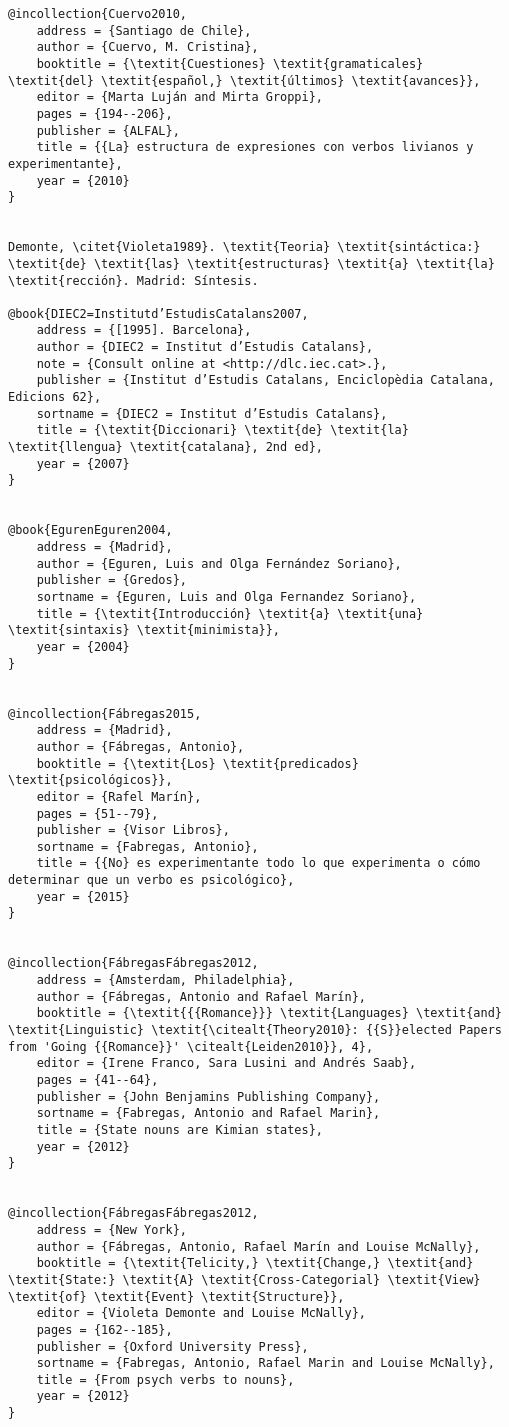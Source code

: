 \documentclass[output=paper,modfonts,nonflat]{langsci/langscibook}
\begin{document}
\begin{verbatim}
@incollection{Cuervo2010,
	address = {Santiago de Chile},
	author = {Cuervo, M. Cristina},
	booktitle = {\textit{Cuestiones} \textit{gramaticales} \textit{del} \textit{español,} \textit{últimos} \textit{avances}},
	editor = {Marta Luján and Mirta Groppi},
	pages = {194--206},
	publisher = {ALFAL},
	title = {{La} estructura de expresiones con verbos livianos y experimentante},
	year = {2010}
}


Demonte, \citet{Violeta1989}. \textit{Teoria} \textit{sintáctica:} \textit{de} \textit{las} \textit{estructuras} \textit{a} \textit{la} \textit{rección}. Madrid: Síntesis.

@book{DIEC2=Institutd’EstudisCatalans2007,
	address = {[1995]. Barcelona},
	author = {DIEC2 = Institut d’Estudis Catalans},
	note = {Consult online at <http://dlc.iec.cat>.},
	publisher = {Institut d’Estudis Catalans, Enciclopèdia Catalana, Edicions 62},
	sortname = {DIEC2 = Institut d’Estudis Catalans},
	title = {\textit{Diccionari} \textit{de} \textit{la} \textit{llengua} \textit{catalana}, 2nd ed},
	year = {2007}
}


@book{EgurenEguren2004,
	address = {Madrid},
	author = {Eguren, Luis and Olga Fernández Soriano},
	publisher = {Gredos},
	sortname = {Eguren, Luis and Olga Fernandez Soriano},
	title = {\textit{Introducción} \textit{a} \textit{una} \textit{sintaxis} \textit{minimista}},
	year = {2004}
}


@incollection{Fábregas2015,
	address = {Madrid},
	author = {Fábregas, Antonio},
	booktitle = {\textit{Los} \textit{predicados} \textit{psicológicos}},
	editor = {Rafel Marín},
	pages = {51--79},
	publisher = {Visor Libros},
	sortname = {Fabregas, Antonio},
	title = {{No} es experimentante todo lo que experimenta o cómo determinar que un verbo es psicológico},
	year = {2015}
}


@incollection{FábregasFábregas2012,
	address = {Amsterdam, Philadelphia},
	author = {Fábregas, Antonio and Rafael Marín},
	booktitle = {\textit{{{Romance}}} \textit{Languages} \textit{and} \textit{Linguistic} \textit{\citealt{Theory2010}: {{S}}elected Papers from 'Going {{Romance}}' \citealt{Leiden2010}}, 4},
	editor = {Irene Franco, Sara Lusini and Andrés Saab},
	pages = {41--64},
	publisher = {John Benjamins Publishing Company},
	sortname = {Fabregas, Antonio and Rafael Marin},
	title = {State nouns are Kimian states},
	year = {2012}
}


@incollection{FábregasFábregas2012,
	address = {New York},
	author = {Fábregas, Antonio, Rafael Marín and Louise McNally},
	booktitle = {\textit{Telicity,} \textit{Change,} \textit{and} \textit{State:} \textit{A} \textit{Cross-Categorial} \textit{View} \textit{of} \textit{Event} \textit{Structure}},
	editor = {Violeta Demonte and Louise McNally},
	pages = {162--185},
	publisher = {Oxford University Press},
	sortname = {Fabregas, Antonio, Rafael Marin and Louise McNally},
	title = {From psych verbs to nouns},
	year = {2012}
}



\end{verbatim}
\end{document}
